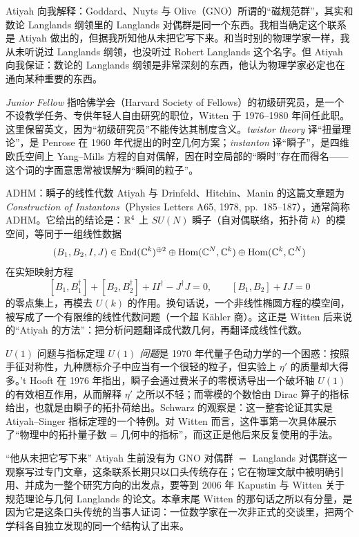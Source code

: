 Atiyah 向我解释：Goddard、Nuyts 与 Olive（GNO）所谓的“磁规范群”，其实和数论 Langlands 纲领里的 Langlands 对偶群是同一个东西。我相当确定这个联系是 Atiyah 做出的，但据我所知他从未把它写下来。和当时别的物理学家一样，我从未听说过 Langlands 纲领，也没听过 Robert Langlands 这个名字。但 Atiyah 向我保证：数论的 Langlands 纲领是非常深刻的东西，他认为物理学家必定也在通向某种重要的东西。

\begin{yizhu}
\emph{Junior Fellow} 指哈佛学会（Harvard Society of Fellows）的初级研究员，是一个不设教学任务、专供年轻人自由研究的职位，Witten 于 1976--1980 年间任此职。这里保留英文，因为“初级研究员”不能传达其制度含义。\emph{twistor theory} 译“扭量理论”，是 Penrose 在 1960 年代提出的时空几何方案；\emph{instanton} 译“瞬子”，是四维欧氏空间上 Yang--Mills 方程的自对偶解，因在时空局部的“瞬时”存在而得名——这个词的字面意思常被误解为“瞬间的粒子”。
\end{yizhu}

\begin{pizhu}{ADHM：瞬子的线性代数}
Atiyah 与 Drinfeld、Hitchin、Manin 的这篇文章题为 \emph{Construction of Instantons}（Physics Letters A65, 1978, pp.~185--187），通常简称 ADHM。它给出的结论是：$\mathbb{R}^4$ 上 $SU(N)$ 瞬子（自对偶联络，拓扑荷 $k$）的模空间，等同于一组线性数据
\[
  (B_1,B_2,I,J)\in \operatorname{End}(\mathbb{C}^k)^{\oplus 2}\oplus \operatorname{Hom}(\mathbb{C}^N,\mathbb{C}^k)\oplus \operatorname{Hom}(\mathbb{C}^k,\mathbb{C}^N)
\]
在实矩映射方程
\[
  [B_1,B_1^\dagger]+[B_2,B_2^\dagger]+II^\dagger-J^\dagger J=0,\qquad
  [B_1,B_2]+IJ=0
\]
的零点集上，再模去 $U(k)$ 的作用。换句话说，一个非线性椭圆方程的模空间，被写成了一个有限维的线性代数问题（一个超 Kähler 商）。这正是 Witten 后来说的“Atiyah 的方法”：把分析问题翻译成代数几何，再翻译成线性代数。
\end{pizhu}

\begin{pizhu}{$U(1)$ 问题与指标定理}
\emph{$U(1)$ 问题}是 1970 年代量子色动力学的一个困惑：按照手征对称性，九种赝标介子中应当有一个很轻的粒子，但实验上 $\eta'$ 的质量却大得多。't Hooft 在 1976 年指出，瞬子会通过费米子的零模诱导出一个破坏轴 $U(1)$ 的有效相互作用，从而解释 $\eta'$ 之所以不轻；而零模的个数恰由 Dirac 算子的指标给出，也就是由瞬子的拓扑荷给出。Schwarz 的观察是：这一整套论证其实是 Atiyah--Singer 指标定理的一个特例。对 Witten 而言，这件事第一次具体展示了“物理中的拓扑量子数 = 几何中的指标”，而这正是他后来反复使用的手法。
\end{pizhu}

\begin{pizhu}{“他从未把它写下来”}
Atiyah 生前没有为 GNO 对偶群 $=$ Langlands 对偶群这一观察写过专门文章，这条联系长期只以口头传统存在；它在物理文献中被明确引用、并成为一整个研究方向的出发点，要等到 2006 年 Kapustin 与 Witten 关于规范理论与几何 Langlands 的论文。本章末尾 Witten 的那句话之所以有分量，是因为它是这条口头传统的当事人证词：一位数学家在一次非正式的交谈里，把两个学科各自独立发现的同一个结构认了出来。
\end{pizhu}
